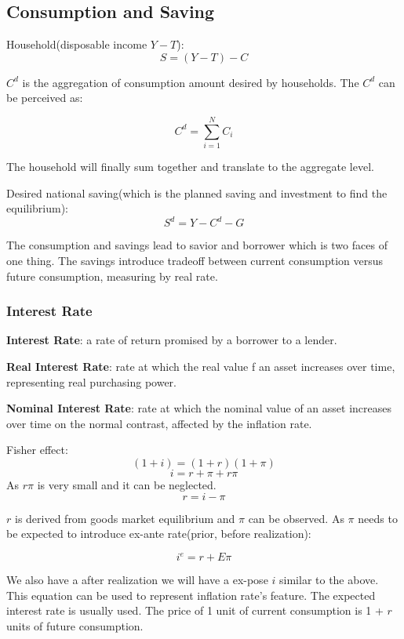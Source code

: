 \documentclass[10pt, a4paper]{article}
\begin{document}
        \subsection{Consumption and Saving}
            Household(disposable income $Y - T$): 
            $$S = (Y - T) - C$$

            $C^d$ is the aggregation of consumption amount desired by households. The $C^d$ can be perceived as: 
            
            $$C^d = \sum_{i = 1}^{N}C_i$$

            The household will finally sum together and translate to the aggregate level. 

            Desired national saving(which is the planned saving and investment to find the equilibrium): 
            $$S^d = Y - C^d - G$$
            
            The consumption and savings lead to savior and borrower which is two faces of one thing. The savings introduce tradeoff between current consumption versus future consumption, measuring by real rate.
            
            \subsubsection{Interest Rate}

            \textbf{Interest Rate}: a rate of return promised by a borrower to a lender. 

            \textbf{Real Interest Rate}: rate at which the real value f an asset increases over time, representing real purchasing power. 
            
            \textbf{Nominal Interest Rate}: rate at which the nominal value of an asset increases over time on the normal contrast, affected by the inflation rate. 
            
            Fisher effect: 
            $$(1 + i) = (1 + r)(1 + \pi)$$
            $$i = r +  \pi + r\pi$$
            As $r\pi$ is very small and it can be neglected. 
            $$r = i - \pi$$
            
            $r$ is derived from goods market equilibrium and $\pi$ can be observed.  As $\pi$ needs to be expected to introduce ex-ante rate(prior, before realization): 

            $$i^e = r + E\pi$$

            We also have a after realization we will have a ex-pose $i$ similar to the above. This equation can be used to represent inflation rate's feature. The expected interest rate is usually used. The price of 1 unit of current consumption is 1 + $r$ units of future consumption. 
            
\end{document}
